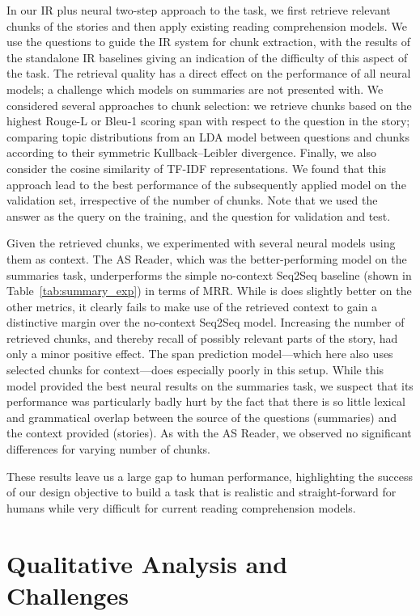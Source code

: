 \documentclass[11pt,letterpaper]{article}
\begin{document}
In our IR plus neural two-step approach to the task, we first retrieve relevant chunks of the stories and then apply existing reading comprehension models. We use the questions to guide the IR system for chunk extraction, with the results of the standalone IR baselines giving an indication of the difficulty of this aspect of the task.
The retrieval quality has a direct effect on the performance of all neural models; a challenge which models on summaries are not presented with.
We considered several approaches to chunk selection: 
we retrieve chunks based on the highest Rouge-L or Bleu-1 scoring span with respect to the question in the story; comparing topic distributions from an LDA model \cite{blei2003latent} between questions and chunks according to their symmetric Kullback--Leibler divergence. Finally, we also consider the cosine similarity of TF-IDF representations. We found that this approach lead to the best performance of the subsequently applied model on the validation set, irrespective of the number of chunks.
Note that we used the answer as the query on the training, and the question for validation and test.

Given the retrieved chunks, we experimented with several neural models using them as context. The AS Reader, which was the better-performing model on the summaries task, underperforms the simple \mbox{no-context} Seq2Seq baseline (shown in Table~\ref{tab:summary_exp}) in terms of MRR. While is does slightly better on the other metrics, it clearly fails to make use of the retrieved context to gain a distinctive margin over the no-context Seq2Seq model. Increasing the number of retrieved chunks, and thereby recall of possibly relevant parts of the story, had only a minor positive effect.
The span prediction model---which here also uses selected chunks for context---does especially poorly in this setup. While this model provided the best neural results on the summaries task, we suspect that its performance was particularly badly hurt by the fact that there is so little lexical and grammatical overlap between the source of the questions (summaries) and the context provided (stories). As with the AS Reader, we observed no significant differences for varying number of chunks.

These results leave us a large gap to human performance, highlighting the success of our design objective to build a task that is realistic and straight-forward for humans while very difficult for current reading comprehension models.


\section{Qualitative Analysis and Challenges}
\label{sec:analysis}
\end{document}
